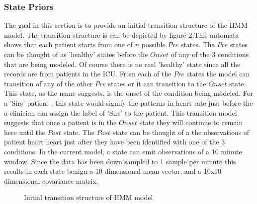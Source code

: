 \documentclass[12pt,solutions]{article}
\begin{document}
\subsubsection{State Priors}
The goal in this section is to provide an initial transition structure of the HMM model. The transition structure is can be depicted by figure 2.This automata shows that each patient starts from one of $n$ possible $Pre$ states. The $Pre$  states can be thought of as 'healthy' states before the $Onset$ of any of the 3 conditions that are being modeled. Of course there is no real 'healthy' state since all the records are from patients in the ICU. From each of the $Pre$ states the model can transition of any of the other $Pre$ states or it can transition to the $Onset$ state. This state, as the name suggests, is the onset of the condition being modeled. For a 'Sirs' patient , this state would signify the patterns in heart rate just before the a clinician can assign the label of 'Sirs' to the patient. This transition model suggests that once a patient is in the $Onset$ state they will continue to remain here until the $Post$ state. The $Post$ state can be thought of a the observations of patient heart heart just after they have been identified with one of the 3 conditions.
In the current model, a state can emit observations of a 10 minute window. Since the data has been down sampled to 1 sample per minute this results in each state benign a 10 dimensional mean vector, and a 10x10 dimensional covariance matrix.
\begin{figure}
\begin{center}
\end{center}
 \caption{Initial transition structure of HMM model}
\end{figure}
\end{document}
